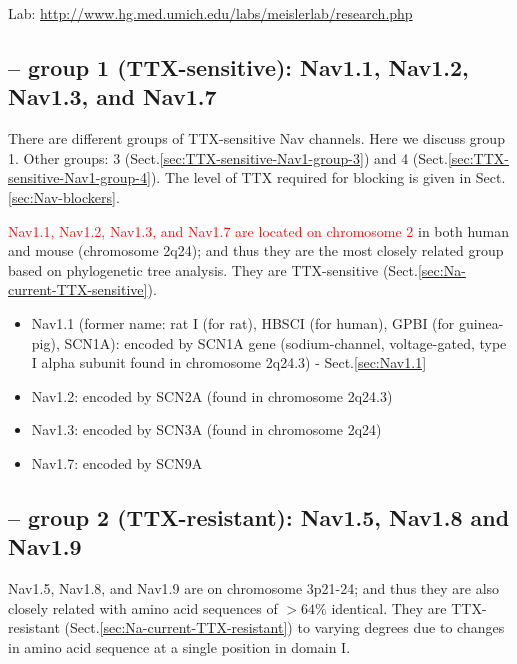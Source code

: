 Lab: \url{http://www.hg.med.umich.edu/labs/meislerlab/research.php}

\subsection{-- group 1 (TTX-sensitive): Nav1.1, Nav1.2, Nav1.3, and Nav1.7}
\label{sec:TTX-sensitive-Nav1}

There are different groups of TTX-sensitive Nav channels. Here we discuss group
1. Other groups: 3 (Sect.\ref{sec:TTX-sensitive-Nav1-group-3}) and 4
(Sect.\ref{sec:TTX-sensitive-Nav1-group-4}). The level of TTX required for
blocking is given in Sect.\ref{sec:Nav-blockers}.

\textcolor{red}{Nav1.1, Nav1.2, Nav1.3, and Nav1.7 are located on chromosome 2}
in both human and mouse (chromosome 2q24); and thus they are the most closely
related group based on phylogenetic tree analysis. They are TTX-sensitive
(Sect.\ref{sec:Na-current-TTX-sensitive}).
   
\begin{itemize}
  
    \item Nav1.1 (former name: rat I (for rat), HBSCI (for human), GPBI (for
    guinea-pig), SCN1A): encoded by SCN1A gene (sodium-channel,
    voltage-gated, type I alpha subunit found in chromosome 2q24.3) -
    Sect.\ref{sec:Nav1.1}
   
  \item Nav1.2: encoded by SCN2A (found in chromosome 2q24.3)
  
  \item Nav1.3: encoded by SCN3A (found in chromosome 2q24)

  \item Nav1.7: encoded by SCN9A
\end{itemize}  


\subsection{-- group 2 (TTX-resistant): Nav1.5, Nav1.8 and Nav1.9}
\label{sec:TTX-resistant-Nav1-group-2}


Nav1.5, Nav1.8, and Nav1.9 are on chromosome 3p21-24; and thus they are also
closely related with amino acid sequences of $> 64\%$ identical.
They are TTX-resistant (Sect.\ref{sec:Na-current-TTX-resistant}) to
varying degrees due to changes in amino acid sequence at a single position in
domain I.

